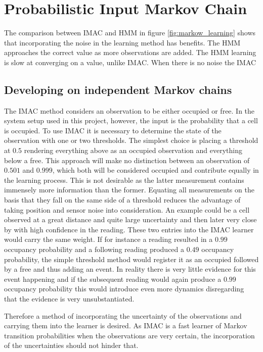 \section{ Probabilistic Input  Markov Chain}
\label{sec:pmac}
The comparison between IMAC and HMM in figure \ref{fig:markow_learning} shows that incorporating the noise in the learning method has benefits. The HMM approaches the correct value as more observations are added. The HMM learning is slow at converging on a value, unlike IMAC. When there is no noise the IMAC 

\subsection{Developing on independent Markov chains}
The IMAC method considers an observation to be either occupied or free. In the system setup used in this project, however, the input is the probability that a cell is occupied. To use IMAC it is necessary to determine the state of the observation with one or two thresholds. The simplest choice is placing a threshold at $0.5$ rendering everything above as an occupied observation and everything below a free. This approach will make no distinction between an observation of $0.501$ and $0.999$, which both will be considered occupied and contribute equally in the learning process. This is not desirable as the latter measurement contains immensely more information than the former. 
Equating all measurements on the basis that they fall on the same side of a threshold reduces the advantage of taking position and sensor noise into consideration. An example could be a cell observed at a great distance and quite large uncertainty and then later very close by with high confidence in the reading. These two entries into the IMAC learner would carry the same weight. If for instance a reading resulted in a $0.99$ occupancy probability and a following reading produced a $0.49$ occupancy probability, the simple threshold method would register it as an occupied followed by a free and thus adding an event. In reality there is very little evidence for this event happening and if the subsequent reading would again produce a $0.99$ occupancy probability this would introduce even more dynamics disregarding that the evidence is very unsubstantiated. 

Therefore a method of incorporating the uncertainty of the observations and carrying them into the learner is desired. As IMAC is a fast learner of Markov transition probabilities when the observations are very certain, the incorporation of the uncertainties should not hinder that. 

